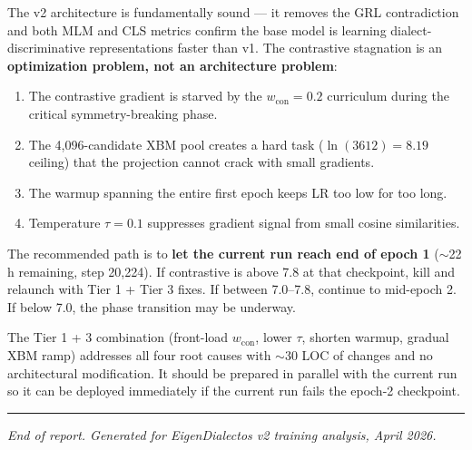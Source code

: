 \documentclass[11pt,a4paper]{article}
\begin{document}
The v2 architecture is fundamentally sound --- it removes the GRL contradiction and
both MLM and CLS metrics confirm the base model is learning dialect-discriminative
representations faster than v1. The contrastive stagnation is an \textbf{optimization
problem, not an architecture problem}:

\begin{enumerate}[nosep]
  \item The contrastive gradient is starved by the $w_{\text{con}} = 0.2$ curriculum
        during the critical symmetry-breaking phase.
  \item The 4{,}096-candidate XBM pool creates a hard task ($\ln(3612) = 8.19$ ceiling)
        that the projection cannot crack with small gradients.
  \item The warmup spanning the entire first epoch keeps LR too low for too long.
  \item Temperature $\tau = 0.1$ suppresses gradient signal from small cosine
        similarities.
\end{enumerate}

The recommended path is to \textbf{let the current run reach end of epoch 1} ($\sim$22\,h
remaining, step 20{,}224). If contrastive is above 7.8 at that checkpoint, kill and
relaunch with Tier 1 + Tier 3 fixes. If between 7.0--7.8, continue to mid-epoch 2. If
below 7.0, the phase transition may be underway.

The Tier 1 + 3 combination (front-load $w_{\text{con}}$, lower $\tau$, shorten warmup,
gradual XBM ramp) addresses all four root causes with $\sim$30 LOC of changes and no
architectural modification. It should be prepared in parallel with the current run so
it can be deployed immediately if the current run fails the epoch-2 checkpoint.

\vspace{1em}
\hrule
\vspace{0.5em}
{\small\textit{End of report. Generated for EigenDialectos v2 training analysis, April 2026.}}
\end{document}
